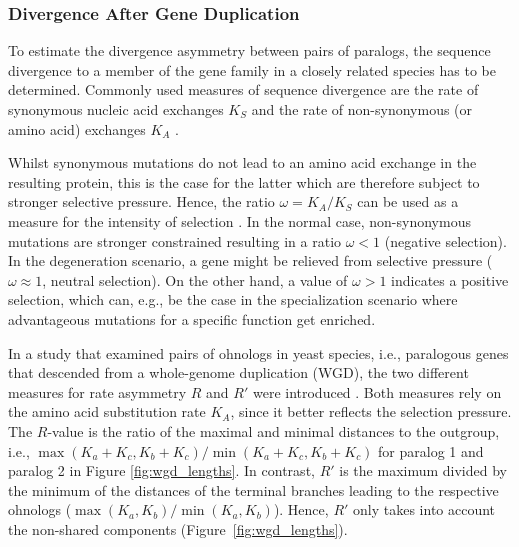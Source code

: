 \documentclass[hidelinks,11pt]{scrreprt}
\begin{document}
\subsubsection{Divergence After Gene Duplication}

To estimate the divergence asymmetry between pairs of paralogs, the sequence divergence to a member of the gene family in a closely related species has to be determined. Commonly used measures of sequence divergence are the rate of synonymous nucleic acid exchanges $K_S$ and the rate of non-synonymous (or amino acid) exchanges $K_A$ \citep{kellis2004,byrne2007,assis2015}.

Whilst synonymous mutations do not lead to an amino acid exchange in the resulting protein, this is the case for the latter which are therefore subject to stronger selective pressure. Hence, the ratio $\omega=K_A/K_S$ can be used as a measure for the intensity of selection \citep{byrne2007,innan2010}. In the normal case, non-synonymous mutations are stronger constrained resulting in a ratio $\omega<1$ (negative selection). In the degeneration scenario, a gene might be relieved from selective pressure ($\omega \approx 1$, neutral selection). On the other hand, a value of $\omega>1$ indicates a positive selection, which can, e.g., be the case in the specialization scenario where advantageous mutations for a specific function get enriched.

In a study that examined pairs of ohnologs in yeast species, i.e., paralogous genes that descended from a whole-genome duplication (WGD), the two different measures for rate asymmetry $R$ and $R'$ were introduced \citep{fares2006,byrne2007}. Both measures rely on the amino acid substitution rate $K_A$, since it better reflects the selection pressure.
The $R$-value is the ratio of the maximal and minimal distances to the outgroup, i.e., $\max(K_a+K_c, K_b+K_c)/\min(K_a+K_c, K_b+K_c)$ for paralog 1 and paralog 2 in Figure \ref{fig:wgd_lengths}. In contrast, $R'$ is the
maximum divided by the minimum of the distances of the terminal branches
leading to the respective ohnologs ($\max(K_a, K_b)/\min(K_a, K_b)$). Hence, $R'$ only takes into account the non-shared components (Figure~\ref{fig:wgd_lengths}).
\end{document}

